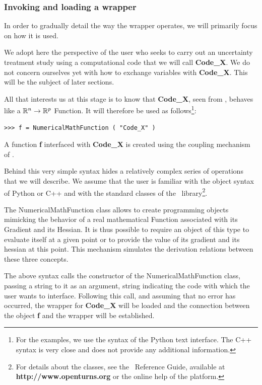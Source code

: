 \subsubsection{Invoking and loading a wrapper}

In order to gradually detail the way the wrapper operates, we will primarily focus on how it is used.

We adopt here the perspective of the user who seeks to carry out an uncertainty treatment study using a computational code that we will call {\bf Code\_X}. We do not concern ourselves yet with how to exchange variables with {\bf Code\_X}. This will be the subject of later sections.

All that interests us at this stage is to know that {\bf Code\_X}, seen from \OT, behaves like a $\mathbb{R}^{n} \to \mathbb{R}^{p}$ Function. It will therefore be used as follows\footnote{For the examples, we use the syntax of the Python text interface. The C++ syntax is very close and does not provide any additional information.}:
\lstset{language=Python, basicstyle=\normalsize}
\begin{lstlisting}[frame=TBRL]
  >>> f = NumericalMathFunction ( "Code_X" )
\end{lstlisting}

A function {\bf f} interfaced with {\bf Code\_X} is created using the coupling mechanism of \OT.

Behind this very simple syntax hides a relatively complex series of operations that we will describe. We assume that the user is familiar with the object syntax of Python or C++ and with the standard classes of the \OT\ library\footnote{For details about the classes, see the \OT\ Reference Guide, available at {\bf http://www.openturns.org} or the online help of the platform.}.

The NumericalMathFunction class allows to create programming objects mimicking the behavior of a real mathematical Function associated with its Gradient and its Hessian. It is thus possible to require an object of this type to evaluate itself at a given point or to provide the value of its gradient and its hessian at this point. This mechanism simulates the derivation relations between these three concepts.

The above syntax calls the constructor of the NumericalMathFunction class, passing a string to it as an argument, string indicating the code with which the user wants to interface. Following this call, and assuming that no error has occurred, the wrapper for {\bf Code\_X} will be loaded and the connection between the object {\bf f} and the wrapper will be established.

